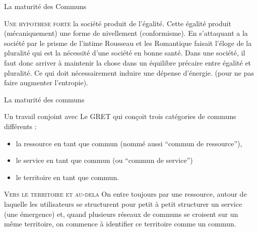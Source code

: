 \documentclass[newPxFont]{beamer}
\begin{document}
  \begin{frame}[c]{La maturité des Communs}
    \vspace{-1cm}
    
    \small{
      \begin{alertblock}{\textsc{Une hypothese forte}}
        la société produit de l’égalité. Cette égalité produit (mécaniquement) une forme de nivellement (conformisme). En s’attaquant a la société par le prisme de l’intime Rousseau et les Romantique faisait l’éloge de la pluralité qui est la nécessité d'une société en bonne santé. Dans une société, il faut donc arriver à maintenir la chose dans un équilibre précaire entre égalité et pluralité. Ce qui doit nécessairement induire une dépense d’énergie. (pour ne pas faire augmenter l'entropie). 
      \end{alertblock}
    }
  
  \end{frame}
  
  \begin{frame}[c]{La maturité des communs}
      \vspace{-1cm}
      
    Un travail conjoint avec Le GRET qui conçoit trois catégories de communs différents :
      \begin{itemize}
          \item la ressource en tant que commun (nommé aussi “commun de ressource”),
          \item le service en tant que commun (ou “commun de service”)
          \item le territoire en tant que commun.
      \end{itemize}
      
       \small{
         \begin{alertblock}{\textsc{Vers le territoire et au-dela}}
           On entre toujours par une ressource, autour de laquelle les utilisateurs se structurent pour petit à petit structurer un service (une émergence) et, quand plusieurs réseaux de communs se croisent sur un même territoire, on commence à identifier ce territoire comme un commun.
         \end{alertblock}
       }
  \end{frame}
      
\end{document}
